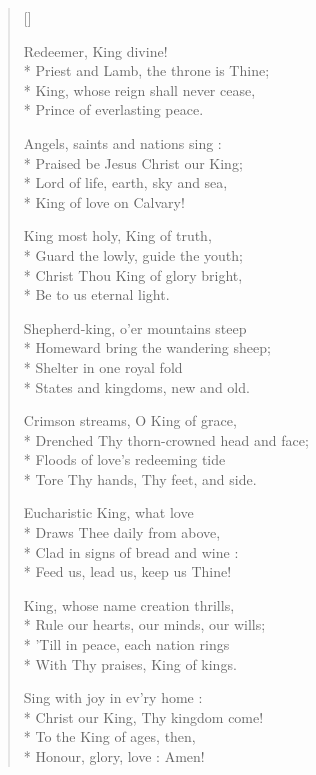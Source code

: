 \newHymn




\begin{verse}[\versewidth]

 Redeemer, King divine!\\*
Priest and Lamb, the throne is Thine;\\*
King, whose reign shall never cease,\\*
Prince of everlasting peace.

\begin{indentedVerse}
\vin Angels, saints and nations sing :\\*
\vin Praised be Jesus Christ our King;\\*
\vin Lord of life, earth, sky and sea,\\*
\vin King of love on Calvary!
\end{indentedVerse}

King most holy, King of truth,\\*
Guard the lowly, guide the youth;\\*
Christ Thou King of glory bright,\\*
Be to us eternal light.

Shepherd-king, o'er mountains steep\\*
Homeward bring the wandering sheep;\\*
Shelter in one royal fold\\*
States and kingdoms, new and old.

Crimson streams, O King of grace,\\*
Drenched Thy thorn-crowned head and face;\\*
Floods of love's redeeming tide\\*
Tore Thy hands, Thy feet, and side.

Eucharistic King, what love\\*
Draws Thee daily from above,\\*
Clad in signs of bread and wine :\\*
Feed us, lead us, keep us Thine!

King, whose name creation thrills,\\*
Rule our hearts, our minds, our wills;\\*
'Till in peace, each nation rings\\*
With Thy praises, King of kings.


\begin{indentedVerse}
\vin Sing with joy in ev'ry home :\\*
\vin Christ our King, Thy kingdom come!\\*
\vin To the King of ages, then,\\*
\vin Honour, glory, love : Amen!
\end{indentedVerse}

\end{verse}

\Hmeter{}

